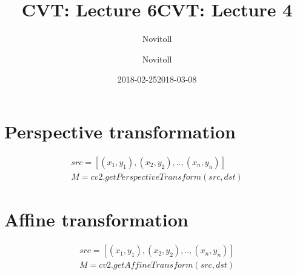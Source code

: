 \documentclass[11pt]{article}
\title{CVT: Lecture 6}
\date{2018-02-25}
\author{Novitoll}
\title{CVT: Lecture 4}
\date{2018-03-08}
\author{Novitoll}
\begin{document}
    \maketitle
    \section{Perspective transformation} \label{sec:perspective transformation}

    \begin{align}
        src = [(x_1, y_1), (x_2, y_2), .., (x_n, y_n)] \\
        M = cv2.getPerspectiveTransform(src, dst)
    \end{align}

    \section{Affine transformation} \label{sec:affine transformation}

    \begin{align}
        src = [(x_1, y_1), (x_2, y_2), .., (x_n, y_n)] \\
        M = cv2.getAffineTransform(src, dst)
    \end{align}
\end{document}
